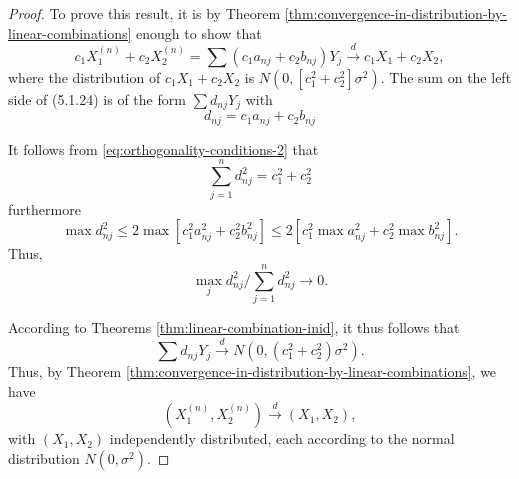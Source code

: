 \begin{proof}
	To prove this result, it is by Theorem \ref{thm:convergence-in-distribution-by-linear-combinations} enough to show that
	\begin{equation*}
		c_{1} X_{1}^{(n)}+c_{2} X_{2}^{(n)}=\sum\left(c_{1} a_{nj}+c_{2} b_{nj}\right) Y_{j} \stackrel{d}{\rightarrow}c_{1} X_{1}+c_{2} X_{2},
	\end{equation*}
	where the distribution of $c_{1} X_{1}+c_{2} X_{2}$ is $N\left(0,\left[c_{1}^2+c_{2}^2\right] \sigma^2\right)$. The sum on the left side of (5.1.24) is of the form $\sum d_{nj} Y_{j}$ with
	\begin{equation*}
		d_{nj}=c_{1} a_{nj}+c_{2} b_{nj}
	\end{equation*}

	It follows from \eqref{eq:orthogonality-conditions-2} that
	\begin{equation*}
		\sum_{j=1}^{n}d_{nj}^2=c_{1}^2+c_{2}^2
	\end{equation*}
	furthermore
	\begin{equation*}
		\max d_{nj}^2\leq 2\max\left[c_{1}^2a_{nj}^2+c_{2}^2 b_{nj}^2\right]\leq 2\left[c_{1}^2 \max a_{nj}^2+c_{2}^2\max b_{nj}^2\right] .
	\end{equation*}
	Thus,
	\begin{equation*}
		\max_{j}d_{nj}^{2}/\sum_{j=1}^{n}d_{nj}^{2}\rightarrow 0.
	\end{equation*}

	According to Theorems \ref{thm:linear-combination-inid}, it thus follows that
	\begin{equation*}
		\sum d_{nj} Y_{j} \stackrel{d}{\rightarrow}N\left(0,\left(c_{1}^2+c_{2}^2\right) \sigma^2\right).
	\end{equation*}
	Thus, by Theorem \ref{thm:convergence-in-distribution-by-linear-combinations}, we have
	\begin{equation*}
		(X_{1}^{(n)},X_{2}^{(n)})\stackrel{d}{\rightarrow}(X_{1},X_{2}),
	\end{equation*}
	with $(X_{1},X_{2})$ independently distributed, each according to the normal distribution $N\left(0,\sigma^2\right)$.
\end{proof}
